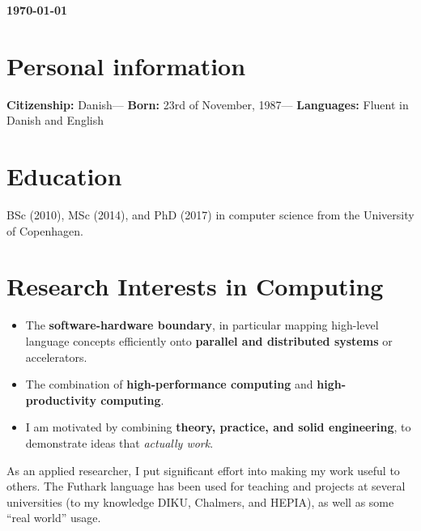 \documentclass{resume} %
\author{Troels Henriksen}
\date{\today}
\begin{document}
\maketitle
\begin{center}
  \textbf{\today}
\end{center}
\section{Personal information}

\textbf{Citizenship:} Danish---
\textbf{Born:} 23rd of November, 1987---
\textbf{Languages:} Fluent in Danish and English

\section{Education}

BSc (2010), MSc (2014), and PhD (2017) in computer science from the
University of Copenhagen.

\section{Research Interests in Computing}

\begin{itemize}
\item The \textbf{software-hardware boundary}, in particular mapping
  high-level language concepts efficiently onto \textbf{parallel and
    distributed systems} or
  accelerators. \cite{Henriksen:2017:FPF:3062341.3062354,Henriksen:2019:IFN:3293883.3295707,Larsen:2017:SRS:3122948.3122952,10.1145/2898354}
\item The combination of \textbf{high-performance computing} and
  \textbf{high-productivity computing}.~\cite{giesekemassively,lindh2019a,10.1145/3331553.3342617,Elsman:2019:DFE:3315454.3329955}
\item I am motivated by combining \textbf{theory, practice, and solid
    engineering}, to demonstrate ideas that \textit{actually
    work}.\cite{Henriksen:2017:FPF:3062341.3062354,Henriksen:2019:IFN:3293883.3295707,Elsman:2018:SIH:3243631.3236792,10.1007/978-3-030-18506-0_7}
\end{itemize}

As an applied researcher, I put significant effort into making my work
useful to others.  The Futhark language has been used for teaching and
projects at several universities (to my knowledge DIKU, Chalmers, and
HEPIA), as well as some ``real world'' usage.
\end{document}
